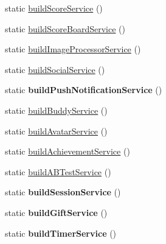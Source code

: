 \begin{DoxyCompactItemize}
\item 
static \hyperlink{class_app42_a_p_i_a663ae6a1a4bb096299e784174f30414a}{build\+Score\+Service} ()
\item 
static \hyperlink{class_app42_a_p_i_a67bba1f8af65a6eb93ac43ec5f1af307}{build\+Score\+Board\+Service} ()
\item 
static \hyperlink{class_app42_a_p_i_ad8d4d769613e8c9b87ff998fcf8aa6ca}{build\+Image\+Processor\+Service} ()
\item 
static \hyperlink{class_app42_a_p_i_adcb4dab9a87a6f479f6f087f12d83f9e}{build\+Social\+Service} ()
\item 
\hypertarget{class_app42_a_p_i_a071ce60dad11980dfb78429e74113ab3}{static {\bfseries build\+Push\+Notification\+Service} ()}\label{class_app42_a_p_i_a071ce60dad11980dfb78429e74113ab3}

\item 
static \hyperlink{class_app42_a_p_i_a95fd3c91a781c82a7d5e01025b00b7ed}{build\+Buddy\+Service} ()
\item 
static \hyperlink{class_app42_a_p_i_a65004fb168efc1e591e68a6fd095b7ed}{build\+Avatar\+Service} ()
\item 
static \hyperlink{class_app42_a_p_i_a9035e10c250493295f1379158b1c468a}{build\+Achievement\+Service} ()
\item 
static \hyperlink{class_app42_a_p_i_ac48dffeb2662b0fad4f07ea33efc4ec1}{build\+A\+B\+Test\+Service} ()
\item 
\hypertarget{class_app42_a_p_i_a6381e15aa72f83c38c04087e19d02e14}{static {\bfseries build\+Session\+Service} ()}\label{class_app42_a_p_i_a6381e15aa72f83c38c04087e19d02e14}

\item 
\hypertarget{class_app42_a_p_i_a5033164cc0ad82810bc4b80c0ff533b7}{static {\bfseries build\+Gift\+Service} ()}\label{class_app42_a_p_i_a5033164cc0ad82810bc4b80c0ff533b7}

\item 
\hypertarget{class_app42_a_p_i_a23ff0e659c4ef1b4b18830d698ffdb9b}{static {\bfseries build\+Timer\+Service} ()}\label{class_app42_a_p_i_a23ff0e659c4ef1b4b18830d698ffdb9b}

\end{DoxyCompactItemize}
